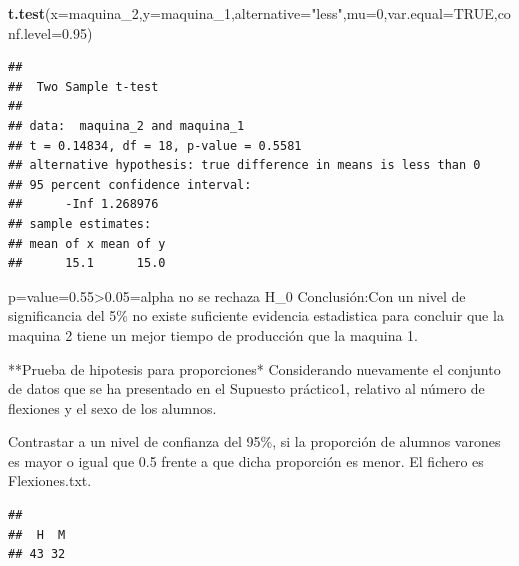 \documentclass[
]{article}
\newenvironment{Shaded}{\begin{snugshade}}{\end{snugshade}}
\newcommand{\AttributeTok}[1]{\textcolor[rgb]{0.13,0.29,0.53}{#1}}
\newcommand{\ConstantTok}[1]{\textcolor[rgb]{0.56,0.35,0.01}{#1}}
\newcommand{\ControlFlowTok}[1]{\textcolor[rgb]{0.13,0.29,0.53}{\textbf{#1}}}
\newcommand{\DecValTok}[1]{\textcolor[rgb]{0.00,0.00,0.81}{#1}}
\newcommand{\FloatTok}[1]{\textcolor[rgb]{0.00,0.00,0.81}{#1}}
\newcommand{\FunctionTok}[1]{\textcolor[rgb]{0.13,0.29,0.53}{\textbf{#1}}}
\newcommand{\NormalTok}[1]{#1}
\newcommand{\OtherTok}[1]{\textcolor[rgb]{0.56,0.35,0.01}{#1}}
\newcommand{\SpecialCharTok}[1]{\textcolor[rgb]{0.81,0.36,0.00}{\textbf{#1}}}
\newcommand{\StringTok}[1]{\textcolor[rgb]{0.31,0.60,0.02}{#1}}
\begin{document}
\begin{Shaded}
\begin{Highlighting}[]
\FunctionTok{t.test}\NormalTok{(}\AttributeTok{x=}\NormalTok{maquina\_2,}\AttributeTok{y=}\NormalTok{maquina\_1,}\AttributeTok{alternative=}\StringTok{"less"}\NormalTok{,}\AttributeTok{mu=}\DecValTok{0}\NormalTok{,}\AttributeTok{var.equal=}\ConstantTok{TRUE}\NormalTok{,}\AttributeTok{conf.level=}\FloatTok{0.95}\NormalTok{)}
\end{Highlighting}
\end{Shaded}

\begin{verbatim}
## 
##  Two Sample t-test
## 
## data:  maquina_2 and maquina_1
## t = 0.14834, df = 18, p-value = 0.5581
## alternative hypothesis: true difference in means is less than 0
## 95 percent confidence interval:
##      -Inf 1.268976
## sample estimates:
## mean of x mean of y 
##      15.1      15.0
\end{verbatim}

p=value=0.55\textgreater0.05=alpha no se rechaza H\_0 Conclusión:Con un
nivel de significancia del 5\% no existe suficiente evidencia
estadistica para concluir que la maquina 2 tiene un mejor tiempo de
producción que la maquina 1.

**Prueba de hipotesis para proporciones* Considerando nuevamente el
conjunto de datos que se ha presentado en el Supuesto práctico1,
relativo al número de flexiones y el sexo de los alumnos.

Contrastar a un nivel de confianza del 95\%, si la proporción de alumnos
varones es mayor o igual que 0.5 frente a que dicha proporción es menor.
El fichero es Flexiones.txt.

\begin{Shaded}
\end{Shaded}

\begin{verbatim}
## 
##  H  M 
## 43 32
\end{verbatim}
\end{document}
